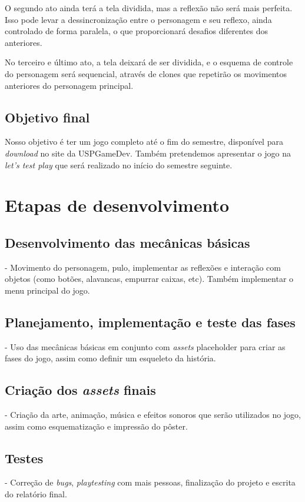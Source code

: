 \documentclass[a4paper, 11pt]{article}
\begin{document}
	O segundo ato ainda terá a tela dividida, mas a reflexão não será mais perfeita. Isso pode levar a dessincronização
entre o personagem e seu reflexo, ainda controlado de forma paralela, o que proporcionará desafios diferentes
dos anteriores.

	No terceiro e último ato, a tela deixará de ser dividida, e o esquema de controle do personagem será sequencial,
através de clones que repetirão os movimentos anteriores do personagem principal.   

\subsection{Objetivo final}
	Nosso objetivo é ter um jogo completo até o fim do semestre, disponível para \textit{download} no site
da USPGameDev. Também pretendemos apresentar o jogo na \textit{let's test play} que será realizado no início
do semestre seguinte. 


\section{Etapas de desenvolvimento}

	\subsection{Desenvolvimento das mecânicas básicas} - Movimento do personagem, pulo, implementar as reflexões e interação com objetos (como botões, alavancas, empurrar caixas, etc). Também implementar o menu principal do jogo.

	\subsection{Planejamento, implementação e teste das fases} - Uso das mecânicas básicas em conjunto com \textit{assets} placeholder para criar as fases do jogo, assim como definir um esqueleto da história.

	\subsection{Criação dos \textit{assets} finais} - Criação da arte, animação, música e efeitos sonoros que serão utilizados no jogo, assim como esquematização e impressão do pôster.

	\subsection{Testes} - Correção de \textit{bugs}, \textit{playtesting} com mais pessoas, finalização do projeto e escrita do relatório final.
\end{document}
